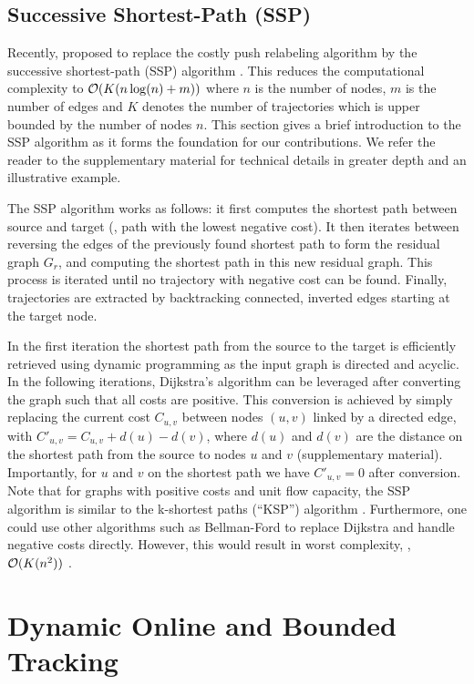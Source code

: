 \documentclass[10pt,twocolumn,letterpaper]{article}
\newcommand{\co}{{\cal O}}
\begin{document}
\subsection{Successive Shortest-Path (SSP)} \label{subsec:SSP}

Recently, \cite{Berclaz2011PAMI,Pirsiavash2011CVPR}  proposed to replace the costly push relabeling algorithm by the successive shortest-path (SSP) algorithm \cite[p.~104]{Ahuja1993}. This reduces the computational complexity to ${\cal O}(K(n\log(n)+m))$ where $n$ is the number of nodes, $m$ is the number of edges and $K$ denotes the number of trajectories which is upper bounded by the number of nodes $n$. This section gives a brief introduction to the SSP algorithm as it forms the foundation for our contributions.  We refer the reader to the supplementary material for technical details in greater depth and an illustrative example.

The SSP algorithm  works as follows: it first computes the shortest path between source and target (\ie, path with  the lowest negative cost). 
It then iterates between reversing the edges of the previously found shortest path to form the residual graph $G_r$,  and computing the shortest path in this new residual graph.   This process is iterated until no trajectory with negative cost can be found.  
 Finally, trajectories are extracted by backtracking connected, inverted edges starting at the target node. 

In the first iteration the shortest path from the source to the target is efficiently retrieved using dynamic programming \cite[p.~655]{Cormen2001} as the input graph is directed and acyclic. In the following iterations, Dijkstra's algorithm can be leveraged after converting the graph such that all costs are positive.
This conversion is achieved by simply replacing the current cost $C_{u,v}$ between nodes $(u,v)$ linked by a directed edge, with $C'_{u,v} = C_{u,v} + d(u) -d(v)$, where $d(u)$ and $d(v)$ are the distance on the shortest path from the source to nodes $u$ and $v$ (\cf supplementary material). Importantly, for $u$ and $v$ on the shortest path we have $C'_{u,v} = 0$ after conversion.
Note that for graphs with positive costs and unit flow capacity, the SSP algorithm is similar to the k-shortest paths (``KSP'') algorithm \cite{Suurballe1974Networks,Suurballe1984Networks}. 
Furthermore, one could use other algorithms such as  Bellman-Ford to replace Dijkstra and handle  negative costs directly. However,  this  would result in worst complexity, \ie, $\co(K(n^2))$ .  \section{Dynamic Online and Bounded Tracking}
\label{sec:dynamicOnlineBounded}
\end{document}
